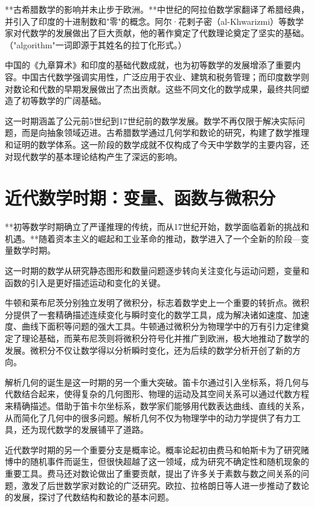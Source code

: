 **古希腊数学的影响并未止步于欧洲。**中世纪的阿拉伯数学家翻译了希腊经典，并引入了印度的十进制数和"零"的概念。阿尔·花剌子密（al-Khwarizmi）等数学家对代数学的发展做出了巨大贡献，他的著作奠定了代数理论奠定了坚实的基础。{（"algorithm"一词即源于其姓名的拉丁化形式。）}

中国的《九章算术》和印度的基础代数成就，也为初等数学的发展增添了重要内容。中国古代数学强调实用性，广泛应用于农业、建筑和税务管理；而印度数学则对数论和代数的早期发展做出了杰出贡献。这些不同文化的数学成果，最终共同塑造了初等数学的广阔基础。

这一时期涵盖了公元前5世纪到17世纪前的数学发展。数学不再仅限于解决实际问题，而是向抽象领域迈进。古希腊数学通过几何学和数论的研究，构建了数学推理和证明的数学体系。这一阶段的数学成就不仅构成了今天中学数学的主要内容，还对现代数学的基本理论结构产生了深远的影响。

\section{近代数学时期：变量、函数与微积分}


**初等数学时期确立了严谨推理的传统，而从17世纪开始，数学面临着新的挑战和机遇。**随着资本主义的崛起和工业革命的推动，数学进入了一个全新的阶段---变量数学时期。

这一时期的数学从研究静态图形和数量问题逐步转向关注变化与运动问题，变量和函数的引入是更好描述运动和变化的关键。

牛顿和莱布尼茨分别独立发明了微积分，标志着数学史上一个重要的转折点。微积分提供了一套精确描述连续变化与瞬时变化的数学工具，成为解决诸如速度、加速度、曲线下面积等问题的强大工具。牛顿通过微积分为物理学中的万有引力定律奠定了理论基础，而莱布尼茨则将微积分符号化并推广到欧洲，极大地推动了数学的发展。微积分不仅让数学得以分析瞬时变化，还为后续的数学分析开创了新的方向。

解析几何的诞生是这一时期的另一个重大突破。笛卡尔通过引入坐标系，将几何与代数结合起来，使得复杂的几何图形、物理的运动及其空间关系可以通过代数方程来精确描述。借助于笛卡尔坐标系，数学家们能够用代数表达曲线、直线的关系，从而简化了几何中的很多问题。解析几何不仅为物理学中的动力学提供了有力工具，还为现代数学的发展铺平了道路。

近代数学时期的另一个重要分支是概率论。概率论起初由费马和帕斯卡为了研究赌博中的随机事件而诞生，但很快超越了这一领域，成为研究不确定性和随机现象的重要工具。费马还对数论做出了重要贡献，提出了许多关于素数与数之间关系的问题，激发了后世数学家对数论的广泛研究。欧拉、拉格朗日等人进一步推动了数论的发展，探讨了代数结构和数论的基本问题。

